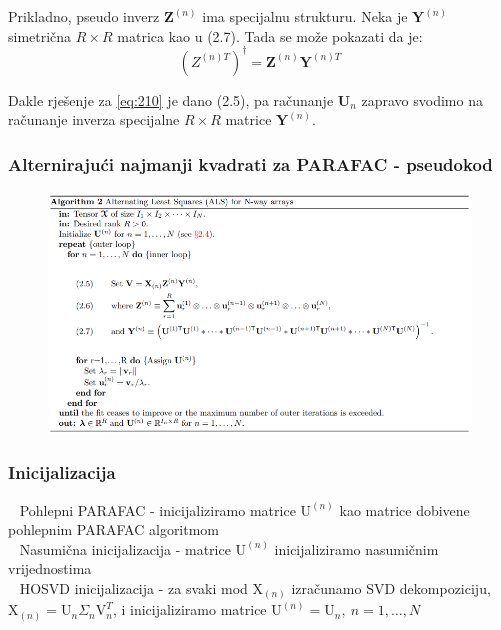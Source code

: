 \documentclass[11pt]{article}
\begin{document}
Prikladno, pseudo inverz $\boldsymbol{Z}^{(n)}$ ima specijalnu strukturu.
Neka je $\boldsymbol{Y}^{(n)}$ simetrična $R \times R$ matrica kao u (2.7).
Tada se može pokazati da je:
\begin{equation}
(Z^{(n)T})^{\dagger} = \boldsymbol{Z}^{(n)} \boldsymbol{Y} ^{(n)T}
\end{equation}

Dakle rješenje za \ref{eq:210} je dano (2.5), pa računanje $\boldsymbol{U}_{n}$  zapravo svodimo na računanje inverza specijalne $R \times R$ matrice $\boldsymbol{Y} ^{(n)}$.

\newpage
\subsubsection{Alternirajući najmanji kvadrati za PARAFAC - pseudokod}

\begin{figure}[hbt!]
    \centering
    \includegraphics[width=420pt]{2.alg.png}  
    \label{fig:5}
\end{figure}


\subsubsection{Inicijalizacija}
\textbullet~ Pohlepni PARAFAC - inicijaliziramo matrice $\mathrm{U}^{(n)}$ kao matrice dobivene pohlepnim PARAFAC algoritmom\\
\textbullet~ Nasumična inicijalizacija - matrice $\mathrm{U}^{(n)}$ inicijaliziramo nasumičnim vrijednostima\\
\textbullet~ HOSVD inicijalizacija - za svaki mod $\mathrm{X}_{(n)}$ izračunamo SVD dekompoziciju, $\mathrm{X}_{(n)} = \mathrm{U}_{n}\Sigma_{n}\mathrm{V}_{n}^{T}$, i inicijaliziramo matrice $\mathrm{U}^{(n)} = \mathrm{U}_{n},~n = 1, \dots , N$
\end{document}
